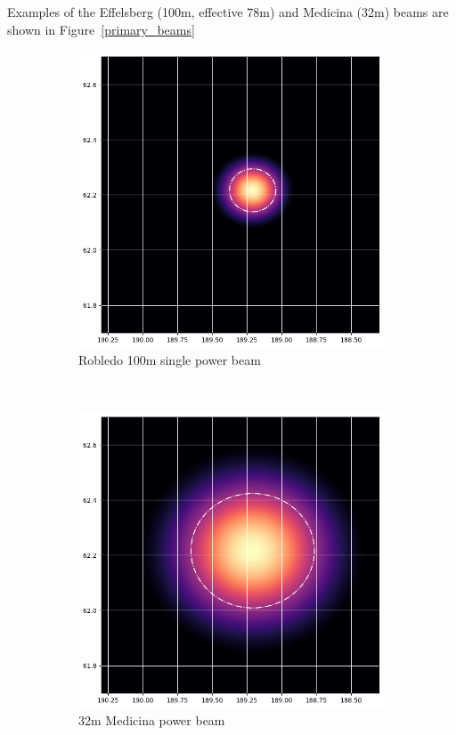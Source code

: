 \documentclass[idxtotoc,hyperref,openany]{article} %
\begin{document}
\begin{enumerate}[topsep=0pt,itemsep=-1ex,partopsep=1ex,parsep=1ex]
	Examples of the Effelsberg (100m, effective 78m) and Medicina (32m) beams are shown in Figure~\ref{primary_beams}
	\begin{figure}[t!]
		\centering
		\begin{subfigure}[t]{0.5\textwidth}
			\centering
			\includegraphics[height=.9\textwidth]{../PB_Plots/ROBLEDO_single_power_beam.png}
			\caption{Robledo 100m single power beam}
		\end{subfigure}%
		~ 
		\begin{subfigure}[t]{0.5\textwidth}
			\centering
			\includegraphics[height=.9\textwidth]{../PB_Plots/MEDICINA_single_power_beam.png}
			\caption{32m Medicina power beam}
		\end{subfigure}
		\caption{}
	\end{figure}


\end{enumerate}
\end{document}
